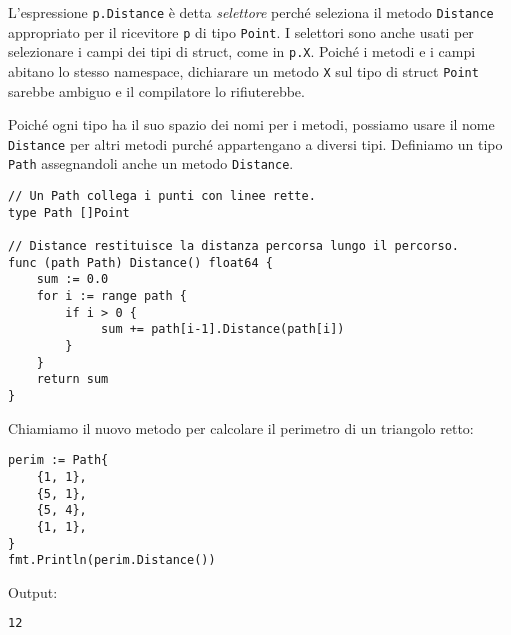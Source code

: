 \documentclass[../../thesis.tex]{subfiles}
\begin{document}
    L'espressione \verb"p.Distance" è detta \textit{selettore} perché seleziona il metodo \verb"Distance" appropriato per il ricevitore \verb"p" di tipo \verb"Point".
    I selettori sono anche usati per selezionare i campi dei tipi di struct, come in \verb"p.X".
    Poiché i metodi e i campi abitano lo stesso namespace, dichiarare un metodo \verb"X" sul tipo di struct \verb"Point" sarebbe ambiguo e il compilatore lo rifiuterebbe.
    \hfill \vspace{12pt}

    Poiché ogni tipo ha il suo spazio dei nomi per i metodi, possiamo usare il nome \verb"Distance" per altri metodi purché appartengano a diversi tipi.
    Definiamo un tipo \verb"Path" assegnandoli anche un metodo \verb"Distance".
    \begin{lstlisting}[frame = single,label={lst:lstlisting5-1.4}]
// Un Path collega i punti con linee rette.
type Path []Point

// Distance restituisce la distanza percorsa lungo il percorso.
func (path Path) Distance() float64 {
    sum := 0.0
    for i := range path {
        if i > 0 {
             sum += path[i-1].Distance(path[i])
        }
    }
    return sum
}
    \end{lstlisting}
    Chiamiamo il nuovo metodo per calcolare il perimetro di un triangolo retto:
    \begin{lstlisting}[frame = single,label={lst:lstlisting5-1.5}]
perim := Path{
    {1, 1},
    {5, 1},
    {5, 4},
    {1, 1},
}
fmt.Println(perim.Distance())
    \end{lstlisting}
    Output:
    \begin{lstlisting}[language = bash, frame = L,label={lst:lstlisting5-1.6}]
12
    \end{lstlisting}
\end{document}
